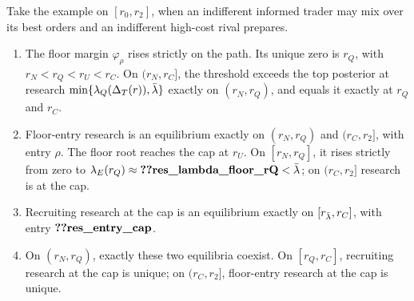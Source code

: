 \begin{lemma}\label{lem:a5-floor}
Take the example on \([r_0,r_2]\), when an indifferent informed trader may mix over its best orders and an indifferent
high-cost rival prepares.
\begin{enumerate}[label=(\alph*),leftmargin=2em]
\item The floor margin \(\varphi_\rho\) rises strictly on the path. Its unique zero is \(r_Q\), with
\(r_N<r_Q<r_U<r_C\). On \((r_N,r_C]\), the threshold exceeds the top posterior at research
\(\min\{\lambda_Q(\Delta_T(r)),\bar\lambda\}\) exactly on \((r_N,r_Q)\), and equals it exactly at \(r_Q\) and \(r_C\).
\item Floor-entry research is an equilibrium exactly on \((r_N,r_Q)\) and \((r_C,r_2]\), with entry \(\rho\).
The floor root reaches the cap at \(r_U\). On \([r_N,r_Q]\), it rises strictly from zero to
\(\lambda_E(r_Q)\approx\reg{res_lambda_floor_rQ}<\lb\); on \((r_C,r_2]\) research is at the cap.
\item Recruiting research at the cap is an equilibrium exactly on \([r_{\bar\lambda},r_C]\), with entry
\(\reg{res_entry_cap}\).
\item On \((r_N,r_Q)\), exactly these two equilibria coexist. On \([r_Q,r_C]\), recruiting research at the cap
is unique; on \((r_C,r_2]\), floor-entry research at the cap is unique.
\end{enumerate}
\end{lemma}

